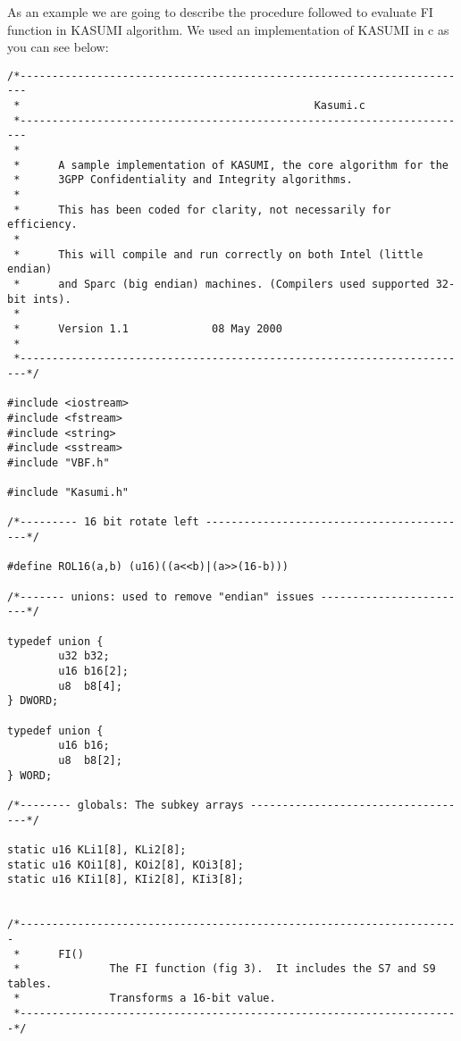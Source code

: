 As an example we are going to describe the procedure followed to evaluate FI function in KASUMI algorithm. We used an implementation of KASUMI in c as you can see below:

\begin{verbatim}
/*-----------------------------------------------------------------------
 *                                              Kasumi.c
 *-----------------------------------------------------------------------
 *
 *      A sample implementation of KASUMI, the core algorithm for the
 *      3GPP Confidentiality and Integrity algorithms.
 *
 *      This has been coded for clarity, not necessarily for efficiency.
 *
 *      This will compile and run correctly on both Intel (little endian)
 *      and Sparc (big endian) machines. (Compilers used supported 32-bit ints).
 *
 *      Version 1.1             08 May 2000
 *
 *-----------------------------------------------------------------------*/

#include <iostream>
#include <fstream>
#include <string>
#include <sstream>
#include "VBF.h"

#include "Kasumi.h"

/*--------- 16 bit rotate left ------------------------------------------*/

#define ROL16(a,b) (u16)((a<<b)|(a>>(16-b)))

/*------- unions: used to remove "endian" issues ------------------------*/

typedef union {
        u32 b32;
        u16 b16[2];
        u8  b8[4];
} DWORD;

typedef union {
        u16 b16;
        u8  b8[2];
} WORD;

/*-------- globals: The subkey arrays -----------------------------------*/

static u16 KLi1[8], KLi2[8];
static u16 KOi1[8], KOi2[8], KOi3[8];
static u16 KIi1[8], KIi2[8], KIi3[8];


/*---------------------------------------------------------------------
 *      FI()
 *              The FI function (fig 3).  It includes the S7 and S9 tables.
 *              Transforms a 16-bit value.
 *---------------------------------------------------------------------*/


\end{verbatim}
